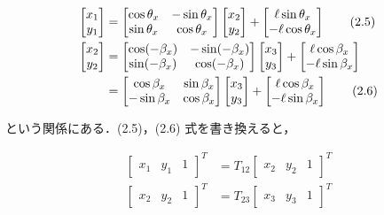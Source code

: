 \begin{align}
    \begin{bmatrix}
    x_1 \\ y_1
    \end{bmatrix}
    &=
    \begin{bmatrix}
    \cos\theta_x & -\sin\theta_x \\
    \sin\theta_x & \cos\theta_x
    \end{bmatrix}
    \begin{bmatrix}
    x_2 \\ y_2
    \end{bmatrix}
    +
    \begin{bmatrix}
    \ell \sin\theta_x \\ -\ell \cos\theta_x
    \end{bmatrix}
    \tag{2.5} \\
    \begin{bmatrix}
    x_2 \\ y_2
    \end{bmatrix}
    &=
    \begin{bmatrix}
    \cos(-\beta_x) & -\sin(-\beta_x) \\
    \sin(-\beta_x) & \cos(-\beta_x)
    \end{bmatrix}
    \begin{bmatrix}
    x_3 \\ y_3
    \end{bmatrix}
    +
    \begin{bmatrix}
    \ell \cos\beta_x \\ -\ell \sin\beta_x
    \end{bmatrix} \notag \\
    &=
    \begin{bmatrix}
    \cos\beta_x & \sin\beta_x \\
    -\sin\beta_x & \cos\beta_x
    \end{bmatrix}
    \begin{bmatrix}
    x_3 \\ y_3
    \end{bmatrix}
    +
    \begin{bmatrix}
    \ell \cos\beta_x \\ -\ell \sin\beta_x
    \end{bmatrix}
    \tag{2.6}
    \end{align}
    

という関係にある．(2.5)，(2.6) 式を書き換えると，

\begin{align}
    \begin{bmatrix}
    x_1 & y_1 & 1
    \end{bmatrix}^T
    &= T_{12}
    \begin{bmatrix}
    x_2 & y_2 & 1
    \end{bmatrix}^T
    \tag{2.7} \\
    \begin{bmatrix}
    x_2 & y_2 & 1
    \end{bmatrix}^T
    &= T_{23}
    \begin{bmatrix}
    x_3 & y_3 & 1
    \end{bmatrix}^T
    \tag{2.8}
    \end{align}
    
